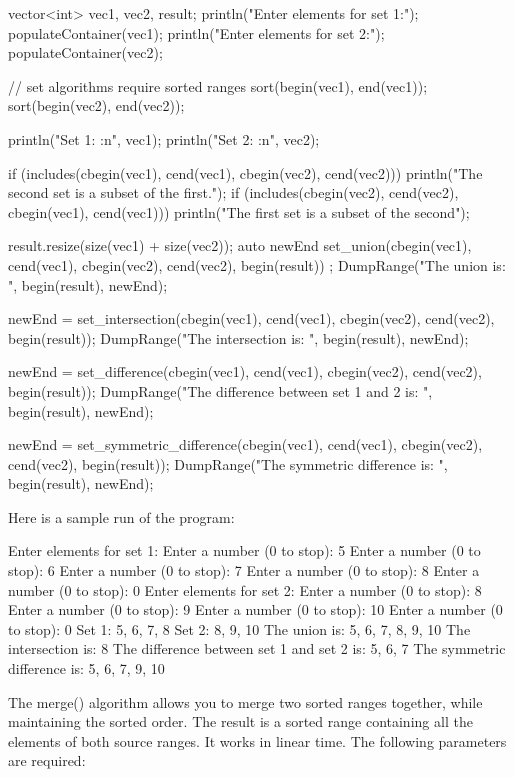 \begin{cpp}
vector<int> vec1, vec2, result;
println("Enter elements for set 1:");
populateContainer(vec1);
println("Enter elements for set 2:");
populateContainer(vec2);

// set algorithms require sorted ranges
sort(begin(vec1), end(vec1));
sort(begin(vec2), end(vec2));

println("Set 1: {:n}", vec1);
println("Set 2: {:n}", vec2);

if (includes(cbegin(vec1), cend(vec1), cbegin(vec2), cend(vec2))) {
    println("The second set is a subset of the first.");
}
if (includes(cbegin(vec2), cend(vec2), cbegin(vec1), cend(vec1))) {
    println("The first set is a subset of the second");
}

result.resize(size(vec1) + size(vec2));
auto newEnd { set_union(cbegin(vec1), cend(vec1), cbegin(vec2),
    cend(vec2), begin(result)) };
DumpRange("The union is: ", begin(result), newEnd);

newEnd = set_intersection(cbegin(vec1), cend(vec1), cbegin(vec2),
cend(vec2), begin(result));
DumpRange("The intersection is: ", begin(result), newEnd);

newEnd = set_difference(cbegin(vec1), cend(vec1), cbegin(vec2),
cend(vec2), begin(result));
DumpRange("The difference between set 1 and 2 is: ", begin(result), newEnd);

newEnd = set_symmetric_difference(cbegin(vec1), cend(vec1),
cbegin(vec2), cend(vec2), begin(result));
DumpRange("The symmetric difference is: ", begin(result), newEnd);
\end{cpp}

Here is a sample run of the program:

\begin{shell}
Enter elements for set 1:
Enter a number (0 to stop): 5
Enter a number (0 to stop): 6
Enter a number (0 to stop): 7
Enter a number (0 to stop): 8
Enter a number (0 to stop): 0
Enter elements for set 2:
Enter a number (0 to stop): 8
Enter a number (0 to stop): 9
Enter a number (0 to stop): 10
Enter a number (0 to stop): 0
Set 1: 5, 6, 7, 8
Set 2: 8, 9, 10
The union is: 5, 6, 7, 8, 9, 10
The intersection is: 8
The difference between set 1 and set 2 is: 5, 6, 7
The symmetric difference is: 5, 6, 7, 9, 10
\end{shell}

The merge() algorithm allows you to merge two sorted ranges together, while maintaining the sorted order. The result is a sorted range containing all the elements of both source ranges. It works in linear time. The following parameters are required:

